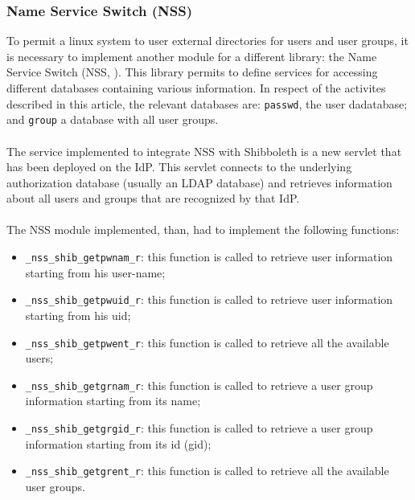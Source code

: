 \subsubsection{Name Service Switch (NSS)}
To permit a linux system to user external directories for users and user groups, it is necessary to implement another module for a different
library: the Name Service Switch (NSS, \cite{GNU-1987}).
This library permits to define services for accessing different databases containing various information.
In respect of the activites described in this article, the relevant databases are: \texttt{passwd}, the user dadatabase; and \texttt{group}
a database with all user groups.\\
\\
The service implemented to integrate NSS with Shibboleth is a new servlet that has been deployed on the IdP.
This servlet connects to the underlying authorization database (usually an LDAP database) and retrieves information about all users and groups
that are recognized by that IdP.\\
\\
The NSS module implemented, than, had to implement the following functions:
\begin{itemize}
\item \texttt{\_nss\_shib\_getpwnam\_r}: this function is called to retrieve user information starting from his user-name;
\item \texttt{\_nss\_shib\_getpwuid\_r}: this function is called to retrieve user information starting from his uid;
\item \texttt{\_nss\_shib\_getpwent\_r}: this function is called to retrieve all the available users;
\item \texttt{\_nss\_shib\_getgrnam\_r}: this function is called to retrieve a user group information starting from its name;
\item \texttt{\_nss\_shib\_getgrgid\_r}: this function is called to retrieve a user group information starting from its id (gid);
\item \texttt{\_nss\_shib\_getgrent\_r}: this function is called to retrieve all the available user groups.
\end{itemize}

